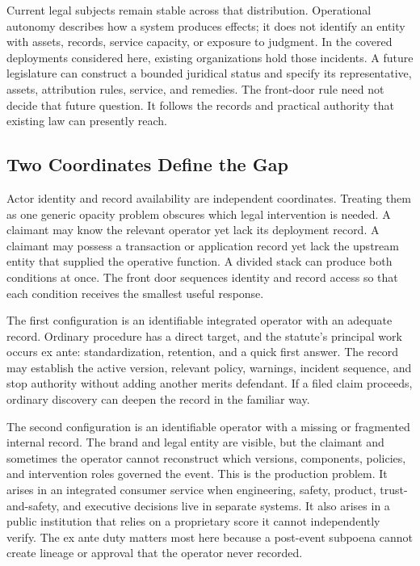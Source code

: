 Current legal subjects remain stable across that distribution. Operational autonomy describes how a system produces effects; it does not identify an entity with assets, records, service capacity, or exposure to judgment. In the covered deployments considered here, existing organizations hold those incidents. A future legislature can construct a bounded juridical status and specify its representative, assets, attribution rules, service, and remedies. The front-door rule need not decide that future question. It follows the records and practical authority that existing law can presently reach.

\subsection{Two Coordinates Define the Gap}

Actor identity and record availability are independent coordinates. Treating them as one generic opacity problem obscures which legal intervention is needed. A claimant may know the relevant operator yet lack its deployment record. A claimant may possess a transaction or application record yet lack the upstream entity that supplied the operative function. A divided stack can produce both conditions at once. The front door sequences identity and record access so that each condition receives the smallest useful response.

The first configuration is an identifiable integrated operator with an adequate record. Ordinary procedure has a direct target, and the statute's principal work occurs ex ante: standardization, retention, and a quick first answer. The record may establish the active version, relevant policy, warnings, incident sequence, and stop authority without adding another merits defendant. If a filed claim proceeds, ordinary discovery can deepen the record in the familiar way.

The second configuration is an identifiable operator with a missing or fragmented internal record. The brand and legal entity are visible, but the claimant and sometimes the operator cannot reconstruct which versions, components, policies, and intervention roles governed the event. This is the production problem. It arises in an integrated consumer service when engineering, safety, product, trust-and-safety, and executive decisions live in separate systems. It also arises in a public institution that relies on a proprietary score it cannot independently verify. The ex ante duty matters most here because a post-event subpoena cannot create lineage or approval that the operator never recorded.

